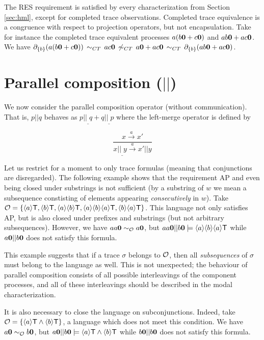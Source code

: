 \documentclass{eptcs}
\def\hmo{{\cal O}}
\def\hmeq{\sim_{\cal O}}
\def\enc{\partial}
\def\transa{\stackrel{a}{\rightarrow}}
\def\transa{\stackrel{a}{\rightarrow}}
\def\true{{\sf T}}
\newcommand{\diam}[1]{\langle#1\rangle}
\newcommand{\lmerge}[2]{#1 ||_{\_} #2}
\begin{document}
The RES requirement is satisfied by every characterization from Section \ref{sec:hml}, except for completed trace observations. Completed trace equivalence is a congruence with respect to projection operators, but not encapsulation. Take for instance the completed trace equivalent processes $a(b{\bf 0}+c{\bf 0})$ and $ab{\bf 0}+ac{\bf 0}$. We have $\enc_{\{b\}}(a(b{\bf 0}+c{\bf 0})) \,\sim_{CT}\, ac{\bf 0} \,\not \sim_{CT}\, a{\bf 0}+ac{\bf 0} \,\sim_{CT}\, \enc_{\{b\}}(ab{\bf 0}+ac{\bf 0})$.



\section{Parallel composition ($||$)}

We now consider the parallel composition operator (without communication). That is, $p ||q$ behaves as $\lmerge{p}{q} + \lmerge{q}{p}$ where the left-merge operator is defined by
\begin{center}
\[ \frac{x \transa x'}{\lmerge{x}{y} \transa x' || y} \]
\end{center}

Let us restrict for a moment to only trace formulas (meaning that conjunctions are disregarded). The following example shows that the requirement AP and even being closed under substrings is not sufficient (by a substring of $w$ we mean a subsequence constisting of elements appearing \textit{consecutively} in $w$). 
Take $\hmo = \{ \diam{a}\true,\diam{b}\true,\diam{a}\diam{b}\true,\diam{a}\diam{b}\diam{a}\true,\diam{b}\diam{a}\true \}$. This language not only satisfies AP, but is also closed under prefixes and substrings (but not arbitrary subsequences). However, we have $aa{\bf 0} \hmeq a{\bf 0}$, but $aa{\bf 0} || b{\bf 0} \models \diam{a}\diam{b}\diam{a}\true$ while $a{\bf 0}||b{\bf 0}$ does not satisfy this formula.

This example suggests that if a trace $\sigma$ belongs to $\hmo$, then all \textit{subsequences} of $\sigma$ must belong to the language as well. This is not unexpected; the behaviour of parallel composition consists of all possible interleavings of the component processes, and all of these interleavings should be described in the modal characterization.

It is also necessary to close the language on subconjunctions. Indeed, take $\hmo = \{ \diam{a}\true \wedge \diam{b} \true \}$, a language which does not meet this condition. We have $a{\bf 0} \hmeq b{\bf 0}$, but $a{\bf 0}||b{\bf 0}\models\diam{a}\true \wedge \diam{b} \true$ while $b{\bf 0}||b{\bf 0}$ does not satisfy this formula.
\end{document}
